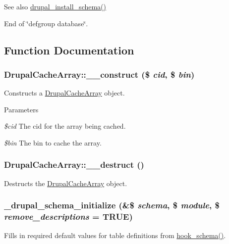 \begin{DoxySeeAlso}{See also}
\hyperlink{group__schemaapi_ga9706b8d6ecdac10302d83bd50935a698}{drupal\_\-install\_\-schema()}
\end{DoxySeeAlso}
End of \char`\"{}defgroup database\char`\"{}. 

\subsection{Function Documentation}
\hypertarget{group__schemaapi_gadbc374d9057276944d38062e769a1a99}{
\subsubsection[{\_\-\_\-construct}]{\setlength{\rightskip}{0pt plus 5cm}DrupalCacheArray::\_\-\_\-construct (\$ {\em cid}, \/  \$ {\em bin})}}
\label{group__schemaapi_gadbc374d9057276944d38062e769a1a99}
Constructs a \hyperlink{classDrupalCacheArray}{DrupalCacheArray} object.


\begin{DoxyParams}{Parameters}
\item[{\em \$cid}]The cid for the array being cached. \item[{\em \$bin}]The bin to cache the array. \end{DoxyParams}
\hypertarget{group__schemaapi_ga63c3aa47f3a451f0c5182800d29d5d9f}{
\subsubsection[{\_\-\_\-destruct}]{\setlength{\rightskip}{0pt plus 5cm}DrupalCacheArray::\_\-\_\-destruct ()}}
\label{group__schemaapi_ga63c3aa47f3a451f0c5182800d29d5d9f}
Destructs the \hyperlink{classDrupalCacheArray}{DrupalCacheArray} object. \hypertarget{group__schemaapi_gad4ce891e1e944b1d6eee7253448a0178}{
\subsubsection[{\_\-drupal\_\-schema\_\-initialize}]{\setlength{\rightskip}{0pt plus 5cm}\_\-drupal\_\-schema\_\-initialize (\&\$ {\em schema}, \/  \$ {\em module}, \/  \$ {\em remove\_\-descriptions} = {\ttfamily TRUE})}}
\label{group__schemaapi_gad4ce891e1e944b1d6eee7253448a0178}
Fills in required default values for table definitions from \hyperlink{group__schemaapi_ga9abd926ddaf68a22e6dca28a25d0c6f5}{hook\_\-schema()}.


